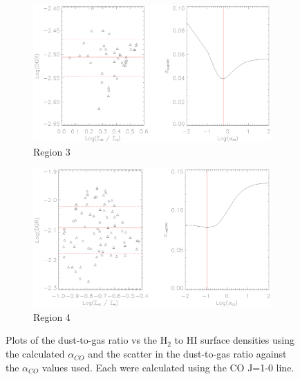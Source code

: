\begin{figure}  
  \ContinuedFloat
  \begin{subfigure}[t]{1\textwidth}
    \centering
    \includegraphics[width=1.\textwidth]{dgr_imgs/region_3_aco_output_10.eps}
    \caption{Region 3}
  \end{subfigure}

  \begin{subfigure}[t]{1\textwidth}
    \centering
    \includegraphics[width=1.\textwidth]{dgr_imgs/region_4_aco_output_10.eps}
    \caption{Region 4}
  \end{subfigure}
   \caption[Dust-to-Gas Ratio Determination Plots for CO J=1-0]{Plots of the dust-to-gas ratio vs the H$_2$ to HI surface densities using the calculated $\alpha_{CO}$ and the scatter in the dust-to-gas ratio against the $\alpha_{CO}$ values used.  Each were calculated using the CO J=1-0 line.}
   \label{fig:dgr_co10}
\end{figure}

